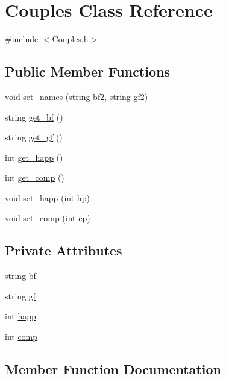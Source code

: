 \hypertarget{classCouples}{}\section{Couples Class Reference}
\label{classCouples}


{\ttfamily \#include $<$Couples.\+h$>$}

\subsection*{Public Member Functions}
\begin{DoxyCompactItemize}
\item 
void \hyperlink{classCouples_aed02f9e556158ecab7d77f541edd1644}{set\+\_\+names} (string bf2, string gf2)
\item 
string \hyperlink{classCouples_af9a18d374ac849559be7cc40867aace7}{get\+\_\+bf} ()
\item 
string \hyperlink{classCouples_a8a6329985b00c3a1ee5e4f7ff95736c1}{get\+\_\+gf} ()
\item 
int \hyperlink{classCouples_a374a87b110d0a447324c0c95634226c7}{get\+\_\+happ} ()
\item 
int \hyperlink{classCouples_ac9dc3a7bdc55ab8f57b6614ebe2a892f}{get\+\_\+comp} ()
\item 
void \hyperlink{classCouples_a217f4f5bbe400c3f9e7560634338e872}{set\+\_\+happ} (int hp)
\item 
void \hyperlink{classCouples_a87a778cca81a7840f04069bdfc30e487}{set\+\_\+comp} (int cp)
\end{DoxyCompactItemize}
\subsection*{Private Attributes}
\begin{DoxyCompactItemize}
\item 
string \hyperlink{classCouples_ab551e7b7c2eb3bdf8ddbdafc55209c31}{bf}
\item 
string \hyperlink{classCouples_a9bf95359b0e7d3684cd30e9491ee9e4c}{gf}
\item 
int \hyperlink{classCouples_acd0ababa52b05be34a7ccfc81757c94f}{happ}
\item 
int \hyperlink{classCouples_a2a40ae5a3c4523fdf2173f7b86d6ac67}{comp}
\end{DoxyCompactItemize}


\subsection{Member Function Documentation}
\mbox{\label{classCouples_af9a18d374ac849559be7cc40867aace7}} 
